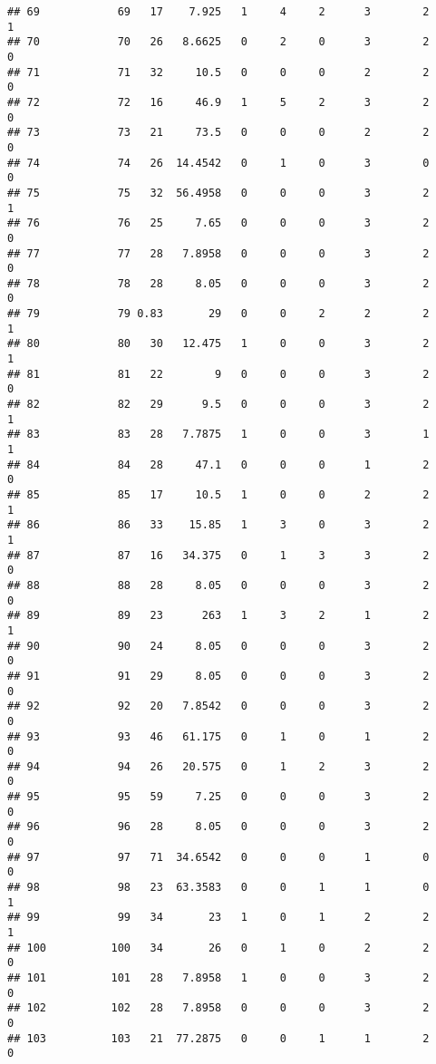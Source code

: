 \documentclass[
]{article}
\begin{document}
\begin{verbatim}
## 69            69   17    7.925   1     4     2      3        2         1
## 70            70   26   8.6625   0     2     0      3        2         0
## 71            71   32     10.5   0     0     0      2        2         0
## 72            72   16     46.9   1     5     2      3        2         0
## 73            73   21     73.5   0     0     0      2        2         0
## 74            74   26  14.4542   0     1     0      3        0         0
## 75            75   32  56.4958   0     0     0      3        2         1
## 76            76   25     7.65   0     0     0      3        2         0
## 77            77   28   7.8958   0     0     0      3        2         0
## 78            78   28     8.05   0     0     0      3        2         0
## 79            79 0.83       29   0     0     2      2        2         1
## 80            80   30   12.475   1     0     0      3        2         1
## 81            81   22        9   0     0     0      3        2         0
## 82            82   29      9.5   0     0     0      3        2         1
## 83            83   28   7.7875   1     0     0      3        1         1
## 84            84   28     47.1   0     0     0      1        2         0
## 85            85   17     10.5   1     0     0      2        2         1
## 86            86   33    15.85   1     3     0      3        2         1
## 87            87   16   34.375   0     1     3      3        2         0
## 88            88   28     8.05   0     0     0      3        2         0
## 89            89   23      263   1     3     2      1        2         1
## 90            90   24     8.05   0     0     0      3        2         0
## 91            91   29     8.05   0     0     0      3        2         0
## 92            92   20   7.8542   0     0     0      3        2         0
## 93            93   46   61.175   0     1     0      1        2         0
## 94            94   26   20.575   0     1     2      3        2         0
## 95            95   59     7.25   0     0     0      3        2         0
## 96            96   28     8.05   0     0     0      3        2         0
## 97            97   71  34.6542   0     0     0      1        0         0
## 98            98   23  63.3583   0     0     1      1        0         1
## 99            99   34       23   1     0     1      2        2         1
## 100          100   34       26   0     1     0      2        2         0
## 101          101   28   7.8958   1     0     0      3        2         0
## 102          102   28   7.8958   0     0     0      3        2         0
## 103          103   21  77.2875   0     0     1      1        2         0

\end{verbatim}
\end{document}
